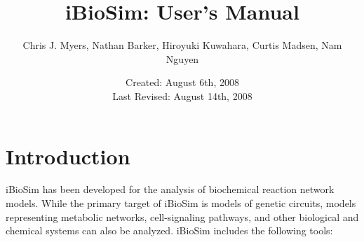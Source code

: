 \documentclass[titlepage,11pt]{article}
\title{iBioSim: User's Manual}
\author{Chris J. Myers, Nathan Barker, Hiroyuki Kuwahara, Curtis
  Madsen, Nam Nguyen}
\date{Created: August 6th, 2008\\
  Last Revised: August 14th, 2008
}
\begin{document}
\maketitle

  
\tableofcontents

\clearpage
  

\section{Introduction}

\noindent
iBioSim has been developed for the analysis of biochemical
reaction network models.  While the primary target of iBioSim is
models of genetic circuits, models representing metabolic
networks, cell-signaling pathways, and other biological and
chemical systems can also be analyzed.  iBioSim includes the
following tools: 
\end{document}
